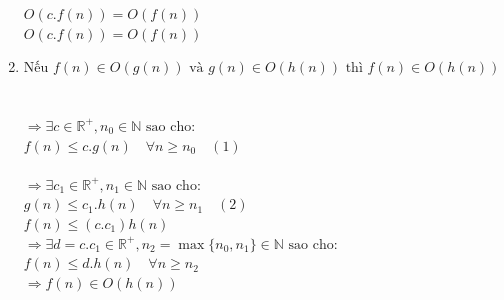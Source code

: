 \documentclass[12pt, letterpaper]{article}
\begin{document}
\begin{enumerate}[label=\bfseries\large\alph*.]
     $O(c.f(n)) = O(f(n))$\\
     $O(c.f(n)) = O(f(n))$

    \item $\text{Nếu } f(n) \in O(g(n)) \text{ và } g(n) \in O(h(n)) \text{ thì } f(n) \in O(h(n))$ \\ \\
     \\
    $\Rightarrow \exists c \in \mathbb{R^+}, n_0 \in \mathbb{N} \text{ sao cho:}$ \\
    $f(n) \leq c.g(n) \quad \forall n \geq n_0 \quad (1)$ \\

     \\
    $\Rightarrow \exists c_1 \in \mathbb{R^+}, n_1 \in \mathbb{N} \text{ sao cho:}$ \\
    $g(n) \leq c_1.h(n) \quad \forall n \geq n_1 \quad (2)$ \\

     $f(n) \leq (c.c_1)h(n)$\\
    $\Rightarrow \exists d = c.c_1 \in \mathbb{R^+},n_2 = \max\{n_0, n_1\} \in \mathbb{N} \text{ sao cho:}$ \\
    $f(n) \leq d.h(n) \quad \forall n \geq n_2$ \\
    $\Rightarrow f(n) \in O(h(n))$\\
     \\
\end{enumerate}

\end{document}
